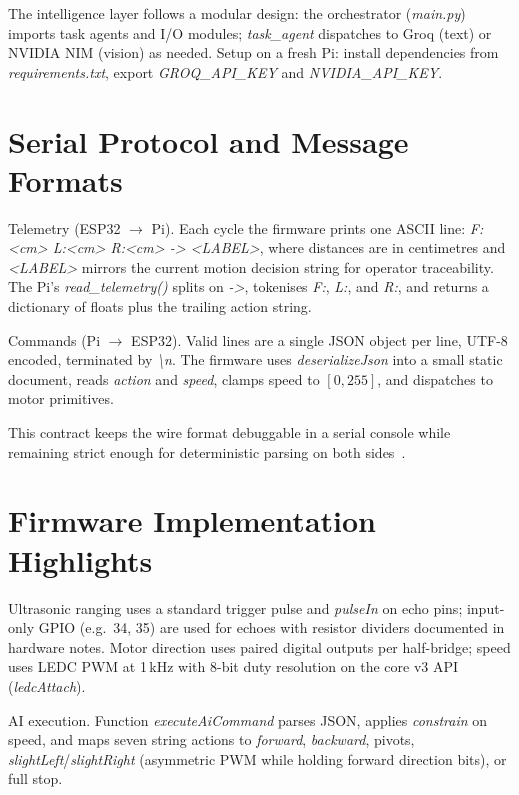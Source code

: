 The intelligence layer follows a modular design: the orchestrator (\textit{main.py}) imports task agents and I/O modules; \textit{task\_agent} dispatches to Groq (text) or NVIDIA NIM (vision) as needed. Setup on a fresh Pi: install dependencies from \textit{requirements.txt}, export \textit{GROQ\_API\_KEY} and \textit{NVIDIA\_API\_KEY}.

\section{Serial Protocol and Message Formats}
\label{sec:protocol}

Telemetry (ESP32 $\rightarrow$ Pi). Each cycle the firmware prints one ASCII line:
\textit{F:<cm> L:<cm> R:<cm> -> <LABEL>}, where distances are in centimetres and \textit{<LABEL>} mirrors the current motion decision string for operator traceability. The Pi's \textit{read\_telemetry()} splits on \textit{->}, tokenises \textit{F:}, \textit{L:}, and \textit{R:}, and returns a dictionary of floats plus the trailing action string.

Commands (Pi $\rightarrow$ ESP32). Valid lines are a single JSON object per line, UTF-8 encoded, terminated by \textit{\textbackslash n}. The firmware uses \textit{deserializeJson} into a small static document, reads \textit{action} and \textit{speed}, clamps speed to $[0,255]$, and dispatches to motor primitives.

This contract keeps the wire format debuggable in a serial console while remaining strict enough for deterministic parsing on both sides~\cite{vemprala2024chatgpt}.

\section{Firmware Implementation Highlights}
\label{sec:impl_fw}

Ultrasonic ranging uses a standard trigger pulse and \textit{pulseIn} on echo pins; input-only GPIO (e.g.\ 34, 35) are used for echoes with resistor dividers documented in hardware notes. Motor direction uses paired digital outputs per half-bridge; speed uses LEDC PWM at 1\,kHz with 8-bit duty resolution on the core v3 API (\textit{ledcAttach}).

AI execution. Function \textit{executeAiCommand} parses JSON, applies \textit{constrain} on speed, and maps seven string actions to \textit{forward}, \textit{backward}, pivots, \textit{slightLeft}/\textit{slightRight} (asymmetric PWM while holding forward direction bits), or full stop.

